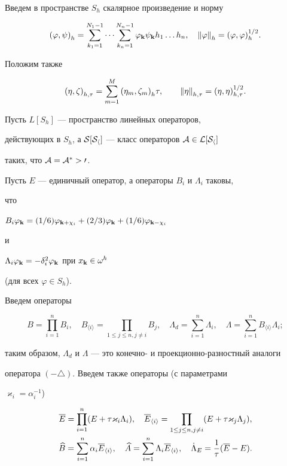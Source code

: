 Введем в пространстве $S_h$ скалярное произведение и норму


$$


{(\varphi ,\psi)}_h=\sum_{k_1=1}^{N_1-1}\dotsb\sum_{k_n=1}^{N_n-1}


\varphi_{\qk}\psi_{\qk}h_1\dotsc h_n,


\quad {\ver\varphi\ver}_h={(\varphi,\varphi)}_h^{1/2}.


$$


Положим также


$$


{(\eta,\zeta)}_{h,\tau}=\sum_{m=1}^M{(\eta_m,\zeta_m)}_h\tau,


\qquad {\ver\eta\ver}_{h,\tau}={(\eta,\eta)}_{h,\tau}^{1/2}.


$$





Пусть $L[S_h]$ --- пространство линейных операторов,


действующих в $S_h$, а $\cal S[S_h]$ --- класс операторов $\cal A\in L[S_h]$


таких, что $\cal A=\cal A^*>0$.


Пусть $E$ --- единичный оператор, а операторы $B_i$ и $\Lambda_i$ таковы,


что


$B_i\varphi_{\qk}=(1/6)\varphi_{{\qk}+\chi_i}+


(2/3)\varphi_{\qk}+(1/6)\varphi_{{\qk}-\chi_i}$


и


$\Lambda_i\varphi_{\bold k}=-\delta_i^2\varphi_{\bold k}$ при $x_{\bold k}\in\omega^h$


(для всех $\varphi\in S_h$).


Введем операторы


$$


B=\prod_{i=1}^n B_i,\quad B_{\langle i\rangle}=\prod_{1\le j\le n, j\ne i}


B_j,\quad\Lambda_d=\sum_{i=1}^n\Lambda_i,\quad


\Lambda=\sum_{i=1}^nB_{\langle i\rangle}\Lambda_i;


$$


таким образом, $\Lambda_d$ и $\Lambda$ --- это конечно- и проекционно-разностный аналоги


оператора $(-\triangle)$. Введем также операторы (с параметрами


$\varkappa_i=\alpha_i^{-1}$)


\begin{gather*}


\overline E=\prod_{i=1}^n(E+\tau\varkappa_i\Lambda_i),\quad


\overline E_{\langle i\rangle}=\prod_{1\le j\le n, j\ne i}


(E+\tau\varkappa_j\Lambda_j), \\


%


\bbb=\sum_{i=1}^n\alpha_i\overline E_{\langle i\rangle},\quad


\aaa=\sum_{i=1}^n\Lambda_i\overline E_{\langle i\rangle},


\quad\Dot\Lambda_E=\frac{1}{\tau}(\overline E-E).


\end{gather*}


